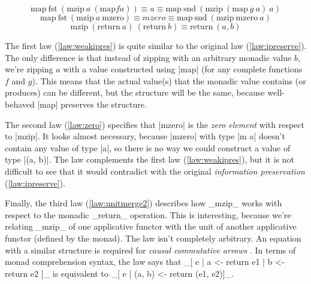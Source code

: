 \documentclass{tmr}
\begin{document}
\begin{equation}
  \text{map} \: \text{fst} \: (\text{mzip} \: a \: (\text{map} f a)) \equiv a \equiv \text{map} \: \text{snd} \: (\text{mzip}\: (\text{map} \: g \: a) \: a)
  \label{law:weakipres}
\end{equation}
\begin{equation}
  \text{map} \: \text{fst} \: (\text{mzip} \: a \: \text{mzero}) \equiv mzero \equiv \text{map} \: \text{snd} \: (\text{mzip} \: \text{mzero} \: a)
  \label{law:zero}
\end{equation}
\begin{equation}
  \text{mzip} \: (\text{return} \: a) \: (\text{return} \: b) \equiv \text{return} \: (a, b)
  \label{law:unitmerge2}
\end{equation}

The first law (\ref{law:weakipres}) is quite similar to the original law (\ref{law:ipreserve}).
The only difference is that instead of zipping with an arbitrary monadic value $b$, we're zipping $a$ 
with a value constructed using |map| (for any complete functions $f$ and $g$). This means that the 
actual value(s) that the monadic value contains (or produces) can be different, but the structure will 
be the same, because well-behaved |map| preserves the structure. 

The second law (\ref{law:zero}) specifies that |mzero| is the \textit{zero element} with respect to 
|mzip|. It looks almost necessary, because |mzero| with type |m a| doesn't contain any value of 
type |a|, so there is no way we could construct a value of type |(a, b)|. The law complements the 
first law (\ref{law:weakipres}), but it is not difficult to see that it would contradict with the 
original \textit{information preservation} (\ref{law:ipreserve}).

\UndefineShortVerb{\|}
\DefineShortVerb{\_}

Finally, the third law (\ref{law:unitmerge2}) describes how _mzip_ works with respect to the monadic 
_return_ operation. This is interesting, because we're relating _mzip_ of one applicative functor with 
the unit of another applicative functor (defined by the monad). The law isn't completely arbitrary. 
An equation with a similar structure is required for \textit{causal commutative arrows} \cite{causalarr}.
In terms of monad comprehension syntax, the law says that _[ e | a <- return e1 | b <- return e2 ]_ 
is equivalent to _[ e | (a, b) <- return (e1, e2)]_.

\UndefineShortVerb{\_}
\DefineShortVerb{\|}
\end{document}
